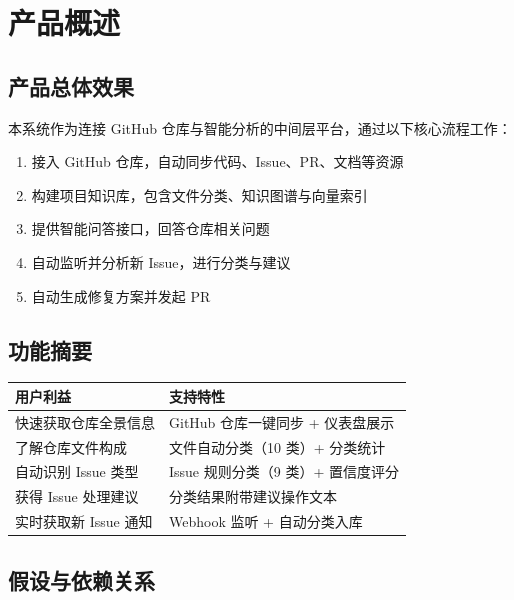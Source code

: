 \documentclass[10pt,a4paper]{article}
\newenvironment{ieeetable}{\begin{center}}{\end{center}}
\begin{document}
\section{产品概述}

\subsection{产品总体效果}

本系统作为连接 GitHub 仓库与智能分析的中间层平台，通过以下核心流程工作：

\begin{enumerate}
    \item 接入 GitHub 仓库，自动同步代码、Issue、PR、文档等资源
    \item 构建项目知识库，包含文件分类、知识图谱与向量索引
    \item 提供智能问答接口，回答仓库相关问题
    \item 自动监听并分析新 Issue，进行分类与建议
    \item 自动生成修复方案并发起 PR
\end{enumerate}

\subsection{功能摘要}

\begin{ieeetable}
    \begin{tabularx}{\textwidth}{L{4cm} X}
        \toprule
        \textbf{用户利益} & \textbf{支持特性} \\
        \midrule
        快速获取仓库全景信息 & GitHub 仓库一键同步 + 仪表盘展示 \\
        \midrule
        了解仓库文件构成 & 文件自动分类（10 类）+ 分类统计 \\
        \midrule
        自动识别 Issue 类型 & Issue 规则分类（9 类）+ 置信度评分 \\
        \midrule
        获得 Issue 处理建议 & 分类结果附带建议操作文本 \\
        \midrule
        实时获取新 Issue 通知 & Webhook 监听 + 自动分类入库 \\
        \bottomrule
    \end{tabularx}
\end{ieeetable}

\subsection{假设与依赖关系}
\end{document}
